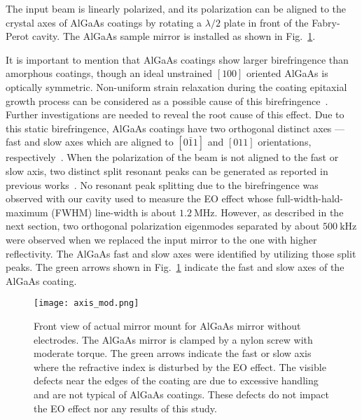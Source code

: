 \documentclass[%
 reprint,
 superscriptaddress,
 amsmath,amssymb,
 aps,
]{revtex4-2}
\newcommand{\unit}[1]{\ \mathrm{#1}}
\begin{document}
The input beam is linearly polarized, and its polarization can be aligned to the crystal axes of AlGaAs coatings by rotating a $\lambda/2$ plate in front of the Fabry-Perot cavity.
The AlGaAs sample mirror is installed as shown in Fig.~\ref{fig.mount}.

It is important to mention that AlGaAs coatings show larger birefringence than amorphous coatings, though an ideal unstrained $[100]$ oriented AlGaAs is optically symmetric.
Non-uniform strain relaxation during the coating epitaxial growth process can be considered as a possible cause of this birefringence~\cite{Buckle2018}.
Further investigations are needed to reveal the root cause of this effect.
Due to this static birefringence, AlGaAs coatings have two orthogonal distinct axes --- fast and slow axes which are aligned to $[0\bar{1}1]$ and $[011]$ orientations, respectively~\cite{thorlabs,Winkler2021}.
When the polarization of the beam is not aligned to the fast or slow axis, two distinct split resonant peaks can be generated as reported in previous works~\cite{Cole2013, Cole2016}.
No resonant peak splitting due to the birefringence was observed with our cavity used to measure the EO effect whose full-width-hald-maximum (FWHM) line-width is about $1.2\unit{MHz}$.
However, as described in the next section, two orthogonal polarization eigenmodes separated by about $500\unit{kHz}$ were observed when we replaced the input mirror to the one with higher reflectivity.
The AlGaAs fast and slow axes were identified by utilizing those split peaks.
The green arrows shown in Fig.~\ref{fig.mount} indicate the fast and slow axes of the AlGaAs coating.



\begin{figure}[htbp]
\texttt{[image: axis\_mod.png]}
\caption{
Front view of actual mirror mount for AlGaAs mirror without electrodes.
The AlGaAs mirror is clamped by a nylon screw with moderate torque.
The green arrows indicate the fast or slow axis where the refractive index is disturbed by the EO effect. The visible defects near the edges of the coating are due to excessive handling and are not typical of AlGaAs coatings. These defects do not impact the EO effect nor any results of this study.
}
\label{fig.mount}
\end{figure}
\end{document}
